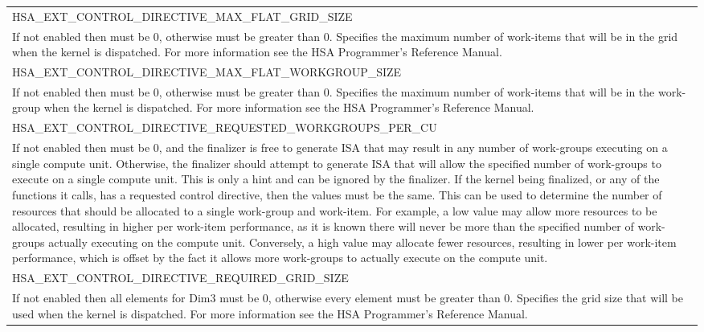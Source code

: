 \documentclass[final,oneside]{book}
\newcommand{\reftyp}[1]{#1}
\newcommand{\refenu}[1]{\reftyp{#1}}
\begin{document}
\begin{longtable}{@{\hspace{2em}}p{\linewidth-2em}}
\hspace{-2em}\refenu{HSA_\-EXT_\-CONTROL_\-DIRECTIVE_\-MAX_\-FLAT_\-GRID_\-SIZE}\\If not enabled then must be 0, otherwise must be greater than 0. Specifies the maximum number of work-items that will be in the grid when the kernel is dispatched. For more information see the HSA Programmer's Reference Manual.\\[2mm]
\hspace{-2em}\refenu{HSA_\-EXT_\-CONTROL_\-DIRECTIVE_\-MAX_\-FLAT_\-WORKGROUP_\-SIZE}\\If not enabled then must be 0, otherwise must be greater than 0. Specifies the maximum number of work-items that will be in the work-group when the kernel is dispatched. For more information see the HSA Programmer's Reference Manual.\\[2mm]
\hspace{-2em}\refenu{HSA_\-EXT_\-CONTROL_\-DIRECTIVE_\-REQUESTED_\-WORKGROUPS_\-PER_\-CU}\\If not enabled then must be 0, and the finalizer is free to generate ISA that may result in any number of work-groups executing on a single compute unit. Otherwise, the finalizer should attempt to generate ISA that will allow the specified number of work-groups to execute on a single compute unit. This is only a hint and can be ignored by the finalizer. If the kernel being finalized, or any of the functions it calls, has a requested control directive, then the values must be the same. This can be used to determine the number of resources that should be allocated to a single work-group and work-item. For example, a low value may allow more resources to be allocated, resulting in higher per work-item performance, as it is known there will never be more than the specified number of work-groups actually executing on the compute unit. Conversely, a high value may allocate fewer resources, resulting in lower per work-item performance, which is offset by the fact it allows more work-groups to actually execute on the compute unit.\\[2mm]
\hspace{-2em}\refenu{HSA_\-EXT_\-CONTROL_\-DIRECTIVE_\-REQUIRED_\-GRID_\-SIZE}\\If not enabled then all elements for Dim3 must be 0, otherwise every element must be greater than 0. Specifies the grid size that will be used when the kernel is dispatched. For more information see the HSA Programmer's Reference Manual.\\[2mm]

\end{longtable}
\end{document}
